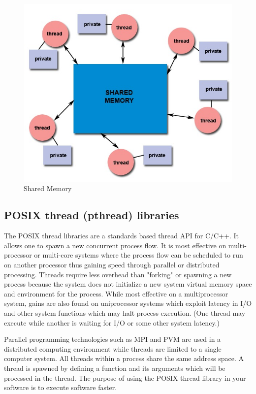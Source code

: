 \begin{figure}[H]
\centering
\includegraphics[scale=0.45]{shared.jpg}
\caption{Shared Memory}
\label{<<Label>>}
\end{figure}

\subsection{POSIX thread (pthread) libraries}
The POSIX thread libraries are a standards based thread API for C/C++. It allows one to spawn a new concurrent process flow. It is most effective on multi-processor or multi-core systems where the process flow can be scheduled to run on another processor thus gaining speed through parallel or distributed processing. Threads require less overhead than "forking" or spawning a new process because the system does not initialize a new system virtual memory space and environment for the process. While most effective on a multiprocessor system, gains are also found on uniprocessor systems which exploit latency in I/O and other system functions which may halt process execution. (One thread may execute while another is waiting for I/O or some other system latency.) 

Parallel programming technologies such as MPI and PVM are used in a distributed computing environment while threads are limited to a single computer system. All threads within a process share the same address space. A thread is spawned by defining a function and its arguments which will be processed in the thread. The purpose of using the POSIX thread library in your software is to execute software faster.

